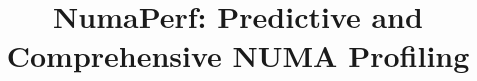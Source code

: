 \usepackage{tikz}
\usepackage{amsmath}

\usepackage{filecontents}

\usepackage{times}
\usepackage{datetime}
\usepackage{url}
\usepackage{hyperref}

\usepackage[normalem]{ulem}
\usepackage{multirow}
\usepackage{comment}
\usepackage{listings}
\usepackage{tikz}
\usepackage{verbatimbox}
\usepackage{amssymb}
\usepackage{pifont}
\usepackage{booktabs}
\usepackage[keeplastbox]{flushend}
\usepackage{enumitem}
\usepackage{caption}

\newcommand*\circled[1]{\tikz[baseline=(char.base)]{
            \node[shape=circle,draw,inner sep=1pt] (char) {\small #1};}}

\newcommand{\todo}[1]{{\color{red}\bfseries [[#1]]}}
\newcommand{\XZ}[1]{{\color{blue}\bfseries [[#1]]}}
\newcommand{\TP}[1]{{\color{red}\bfseries [[#1]]}}
\newcommand{\HG}[1]{{\color{magenta}\bfseries [[#1]]}}
\newcommand{\NP}{\texttt{NumaPerf}}
\newcommand{\specialcell}[2][c]{%
  \begin{tabular}[#1]{@{}c@{}}#2\end{tabular}}
  \newcommand{\TM}{\text{thread migration}}
  \newcommand{\PS}{\text{remote access}}
  \newcommand{\TS}{\text{true sharing}}
  \newcommand{\FS}{\text{false sharing}}
  \newcommand{\TI}{\text{thread imbalance}}   \newcommand{\TB}{\text{thread binding}}
  \newcommand{\BI}{\text{block interleave}}
  \newcommand{\PI}{\text{page interleave}}
  \newcommand{\PAD}{\text{padding}}
  \newcommand{\DUP}{\text{duplicate}}






\date{}

\title{NumaPerf: Predictive and Comprehensive NUMA Profiling}


